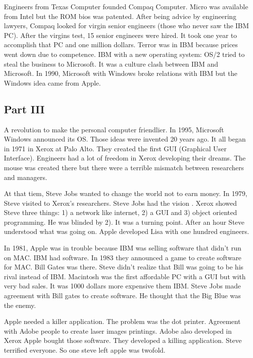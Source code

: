  Engineers from Texas Computer founded Compaq Computer. 
 Micro was available from Intel but the ROM bios was patented.
 After being advice by engineering lawyers, Compaq looked for virgin senior engineers 
 (those who never saw the IBM PC).  After the virgins test, 15 senior engineers were hired. 
 It took one year to accomplish that PC and one million dollars. 
 Terror was in IBM because prices went down due to competence.   
 IBM with a new operating system: OS/2 tried to steal the business to Microsoft. 
 It was a culture clash between IBM and Microsoft. 
 In 1990,  Microsoft with Windows broke 
 relations with IBM but the Windows idea came from Apple.   
   
  
 \subsection*{Part III} 
 A revolution to make the personal computer friendlier.  
 In 1995,  Microsoft Windows announced its OS. 
 Those ideas were invented 20 years ago. 
 It all began in 1971 in  Xerox at Palo Alto. 
 They created the first GUI (Graphical User Interface).
 Engineers had a lot of freedom in Xerox developing  their dreams. The mouse was 
 created there but there were a terrible mismatch between researchers and managers. 
 
 At that tiem, Steve Jobs wanted to change the world not to earn money.
 In 1979, Steve  visited to Xerox's researchers. 
 Steve Jobs had the vision . Xerox showed Steve three things: 1) a network like internet, 
 2) a GUI and  3) object oriented programming. He 
 was blinded by 2). It was a turning point. 
 After an hour Steve understood what was going on. 
 Apple developed Lisa with one hundred engineers. 
   
 In 1981, Apple was in trouble because IBM was selling software that didn't run on MAC. 
 IBM had software. In 1983 they announced a game to 
 create software for MAC. Bill Gates was there. 
 Steve didn't realize that Bill was going to be his rival instead of IBM. 
 Macintosh was the first 
 affordable PC with a GUI but with  very bad sales. 
 It was 1000 dollars more expensive them IBM.  
 Steve Jobs made agreement with Bill gates to create software. 
 He thought that the Big Blue was the enemy. 
   
   
 Apple needed a killer application. 
 The problem was the dot printer. Agreement with Adobe people to create laser images printings. 
 Adobe also developed in Xerox 
 Apple bought those software.
 They developed a killing application. 
 Steve terrified everyone. 
 So one steve left apple was twofold. 
   
